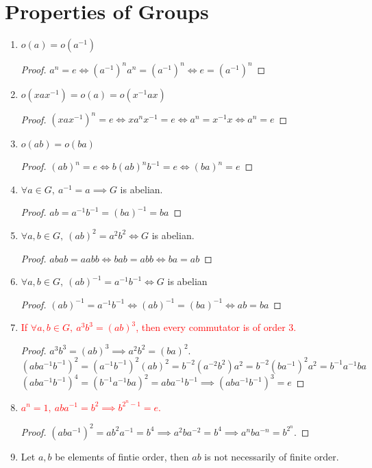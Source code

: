 \section{Properties of Groups}
\begin{enumerate}
	\item $o(a)=o(a^{-1})$
	\begin{proof}
		$a^n = e \iff (a^{-1})^n a^n = (a^{-1})^n \iff e = (a^{-1})^n$
	\end{proof}
	\item $o(xax^{-1}) = o(a) = o(x^{-1}ax)$
	\begin{proof}
		$(xax^{-1})^n = e \iff  xa^nx^{-1} = e \iff a^n = x^{-1}x \iff a^n = e$
	\end{proof}
	\item $o(ab) = o(ba)$
	\begin{proof}
		$(ab)^n = e \iff b(ab)^nb^{-1} = e \iff (ba)^n = e$
	\end{proof}
	\item $\forall a \in G,\ a^{-1} = a \implies G$ is abelian.
	\begin{proof}
		$ab = a^{-1}b^{-1} = (ba)^{-1} = ba$
	\end{proof}
	\item $\forall a,b \in G,\ (ab)^2 = a^2b^2 \iff G$ is abelian.
	\begin{proof}
		$abab = aabb \iff bab = abb \iff ba = ab$
	\end{proof}
	\item $\forall a,b \in G,\ (ab)^{-1} = a^{-1}b^{-1} \iff G$ is abelian
	\begin{proof}
		$(ab)^{-1} = a^{-1}b^{-1} \iff (ab)^{-1} = (ba)^{-1} \iff ab = ba$
	\end{proof}
\item \textcolor{red}{If $\forall a,b \in G,\ a^3b^3 = (ab)^3$, then every commutator is of order $3$.}
	\begin{proof}
	$a^3b^3 = (ab)^3 \implies a^2b^2 = (ba)^2$.
	$$(aba^{-1}b^{-1})^2 = (a^{-1}b^{-1})^2(ab)^2 = b^{-2}(a^{-2}b^2)a^2 = b^{-2}(ba^{-1})^2a^2 = b^{-1}a^{-1}ba$$
		$(aba^{-1}b^{-1})^4 = (b^{-1}a^{-1}ba)^2 = aba^{-1}b^{-1} \implies (aba^{-1}b^{-1})^3 = e$
	\end{proof}
	\item \textcolor{red}{$a^n = 1,\ aba^{-1} = b^2 \implies b^{2^n-1} = e$.}
	\begin{proof}
		$(aba^{-1})^2 = ab^2a^{-1} = b^4 \implies a^2ba^{-2} = b^4 \implies a^nba^{-n}=b^{2^n}$.
	\end{proof}
	\item Let $a,b$ be elements of fintie order, then $ab$ is not necessarily of finite order.

\end{enumerate}
